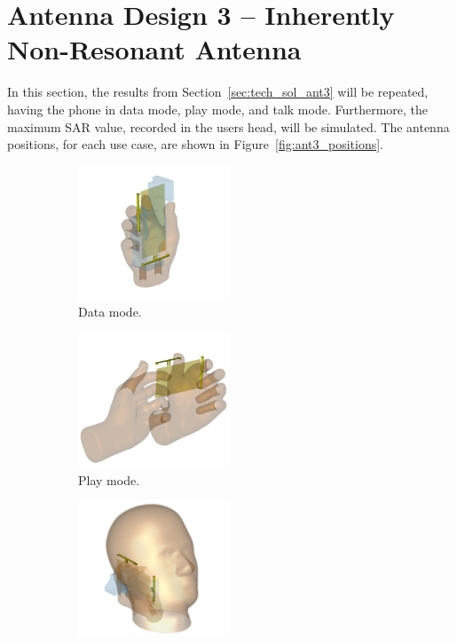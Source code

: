 \section{Antenna Design 3 -- Inherently Non-Resonant Antenna}
In this section, the results from Section~\ref{sec:tech_sol_ant3} will be repeated, having the phone in data mode, play mode, and talk mode. Furthermore, the maximum SAR value, recorded in the users head, will be simulated. The antenna positions, for each use case, are shown in Figure~\ref{fig:ant3_positions}.

\begin{figure}[htbp]
    \centering
    \begin{subfigure}[b]{0.24\linewidth}
        \centering
        \includegraphics[width=\linewidth,height=4cm,keepaspectratio]{img/tech_sol/nonresonant/simulation/data_mode/3d}
        \caption{Data mode.}
    \end{subfigure}
    \begin{subfigure}[b]{0.24\linewidth}
        \centering
        \includegraphics[width=\linewidth,height=4cm,keepaspectratio]{img/tech_sol/nonresonant/simulation/play_mode/3d}
        \caption{Play mode.}
    \end{subfigure}
    \begin{subfigure}[b]{0.24\linewidth}
        \centering
        \includegraphics[width=\linewidth,height=4cm,keepaspectratio]{img/tech_sol/nonresonant/simulation/talk_mode/3d}

\end{subfigure}
\end{figure}
